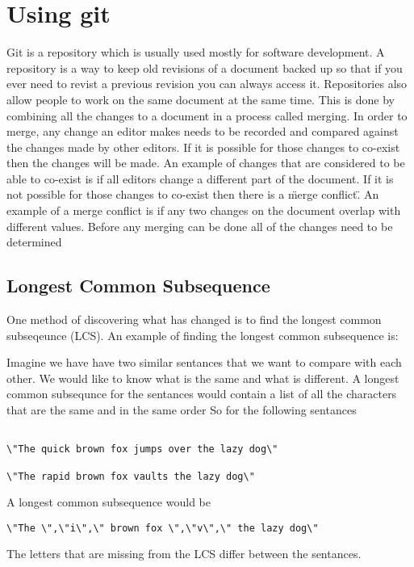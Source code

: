 
\chapter{Using git}
Git is a repository which is usually used mostly for software development.
A repository is a way to keep old revisions of a document backed up so that if you ever need to revist a previous revision you can always access it.
Repositories also allow people to work on the same document at the same time.
This is done by combining all the changes to a document in a process called merging. 
In order to merge, any change an editor makes needs to be recorded and compared against the changes made by other editors.
If it is possible for those changes to co-exist then the changes will be made.
An example of changes that are considered to be able to co-exist is if all editors change a different part of the document.
If it is not possible for those changes to co-exist then there is a \"merge conflict\".
An example of a merge conflict is if any two changes on the document overlap with different values.
Before any merging can be done all of the changes need to be determined 

\section{Longest Common Subsequence}
One method of discovering what has changed is to find the longest common subseqeunce (LCS).
An example of finding the longest common subsequence is:

Imagine we have have two similar sentances that we want to compare with each other.  
We would like to know what is the same and what is different.
A longest common subsequnce for the sentances would contain a list of all the characters that are the same and in the same order
So for the following sentances

\begin{verbatim}

\"The quick brown fox jumps over the lazy dog\"

\"The rapid brown fox vaults the lazy dog\"

\end{verbatim}
A longest common subsequence would be
\begin{verbatim}
\"The \",\"i\",\" brown fox \",\"v\",\" the lazy dog\"
\end{verbatim}
The letters that are missing from the LCS differ between the sentances.

